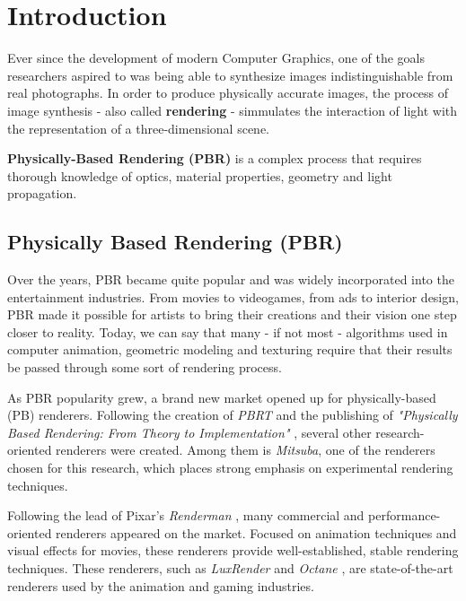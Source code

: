 \chapter{Introduction}

Ever since the development of modern Computer Graphics, one of the goals 
researchers aspired to was being able to synthesize images indistinguishable 
from real photographs. In order to produce physically accurate images, the 
process of image synthesis - also called \textbf{rendering} - simmulates the 
interaction of light with the representation of a three-dimensional scene. 

\textbf{Physically-Based Rendering (PBR)} is a complex process that requires 
thorough knowledge of optics, material properties, geometry and light 
propagation.

\section{Physically Based Rendering (PBR)}
Over the years, PBR became quite popular and was widely incorporated into the 
entertainment industries. From movies to videogames, from ads to interior 
design, PBR made it possible for artists to bring their creations and their 
vision one step closer to reality. Today, we can say that many - if not most - 
algorithms used in computer animation, geometric modeling and texturing require 
that their results be passed through some sort of rendering process.

As PBR popularity grew, a brand new market opened up for physically-based (PB) 
renderers. Following the creation of \textit{PBRT} and the publishing of 
\textit{"Physically Based Rendering: From Theory to Implementation"} 
\cite{pbrt}, several other research-oriented renderers were created. Among them 
is \textit{Mitsuba}, one of the renderers chosen for this research, which places 
strong emphasis on experimental rendering techniques.

Following the lead of Pixar's \textit{Renderman} \cite{renderman}, many 
commercial and performance-oriented renderers appeared on the market. Focused on 
animation techniques and visual effects for movies, these renderers provide 
well-established, stable rendering techniques. These renderers, such as 
\textit{LuxRender} \cite{luxrender} and \textit{Octane} \cite{octane}, are 
state-of-the-art renderers used by the animation and gaming industries.

